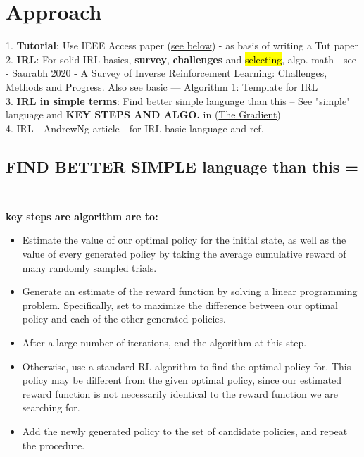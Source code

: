 \documentclass{article}
\newcommand{\hlc}[2][blue!10]{{\colorlet{foo}{#1} \sethlcolor{foo}\hl{#2}}}
\begin{document}
\section{Approach}

1. \textbf{Tutorial}: Use IEEE Access paper (\href{https://ieeexplore.ieee.org/document/9086464}{see below}) - as basis of writing a Tut paper\\
2. \textbf{IRL}: For solid IRL basics, \textbf{survey}, \textbf{challenges} and \hlc{selecting},  algo. math - see - Saurabh 2020 - A Survey of Inverse Reinforcement Learning: Challenges, Methods and Progress. Also see basic --- Algorithm 1: Template for IRL \\
3. \textbf{IRL in simple terms}: Find better simple language than this --  See "simple" language and \textbf{KEY STEPS AND ALGO.} in (\href{https://thegradient.pub/learning-from-humans-what-is-inverse-reinforcement-learning/}{The Gradient}) \\
4. IRL - AndrewNg article - for IRL basic language and ref. 

\subsection{FIND BETTER SIMPLE language than this =--- }

\textbf{key steps are algorithm are to:}
\begin{itemize}
	\item Estimate the value of our optimal policy for the initial state, as well as the value of every generated policy 	by taking the average cumulative reward of many randomly sampled trials.
	
	\item Generate an estimate of the reward function by solving a linear programming problem. Specifically, set to maximize the difference between our optimal policy and each of the other generated policies.
	
	\item After a large number of iterations, end the algorithm at this step.
	
	\item Otherwise, use a standard RL algorithm to find the optimal policy for. This policy may be different from the given optimal policy, since our estimated reward function is not necessarily identical to the reward function we are searching for.
	
	\item Add the newly generated policy to the set of candidate policies, and repeat the procedure.
\end{itemize}
\end{document}

